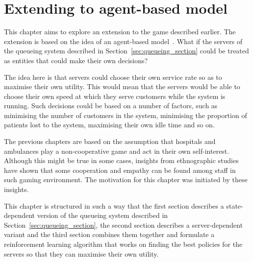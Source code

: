 \chapter{Extending to agent-based model}

This chapter aims to explore an extension to the game described earlier.
The extension is based on the idea of an agent-based
model~\cite{de2014agent, fetta2012peter, knight2012modelling}.
What if the servers of the queueing system described in
Section~\ref{sec:queueing_section} could be treated as entities that could make
their own decisions?

The idea here is that servers could choose their own service rate so as to
maximise their own utility.
This would mean that the servers would be able to choose their own speed at
which they serve customers while the system is running.
Such decisions could be based on a number of factors, such as minimising the
number of customers in the system, minimising the proportion of patients lost
to the system, maximising their own idle time and so on.

The previous chapters are based on the assumption that hospitals and ambulances
play a non-cooperative game and act in their own self-interest.
Although this might be true in some cases, insights from ethnographic
studies~\cite{allen2004understanding} have shown that some cooperation and
empathy can be found among staff in such gaming environment.
The motivation for this chapter was initiated by these insights.

This chapter is structured in such a way that the first section describes a
state-dependent version of the queueing system described in
Section~\ref{sec:queueing_section}, the second section describes
a server-dependent variant and the third section combines them together and
formulate a reinforcement learning algorithm that works on finding the best
policies for the servers so that they can maximise their own utility.











